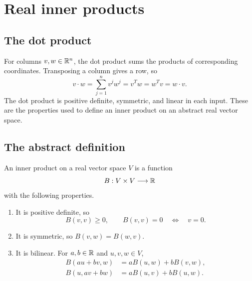 \section{Real inner products}
\label{sec:linear-algebra-i:real-inner-products}

\subsection{The dot product}

For columns \(v,w\in\mathbb{R}^n\), the dot product sums the products of
corresponding coordinates. Transposing a column gives a row, so
\[
  v\cdot w=\sum_{j=1}^n v^jw^j=v^Tw=w^Tv=w\cdot v.
\]
The dot product is positive definite, symmetric, and linear in each
input. These are the properties used to define an inner product on
an abstract real vector space.

\subsection{The abstract definition}


\begin{definition}
  An inner product on a real vector space \(V\) is a function
  \[
    B:V\times V\longrightarrow\mathbb{R}
  \]
  with the following properties.
  \begin{enumerate}
    \item It is positive definite, so
      \[
        B(v,v)\ge0,\qquad B(v,v)=0\quad\Longleftrightarrow\quad v=0.
      \]
    \item It is symmetric, so \(B(v,w)=B(w,v)\).
    \item It is bilinear. For \(a,b\in\mathbb{R}\) and \(u,v,w\in V\),
      \[
        \begin{aligned}
          B(au+bv,w)&=aB(u,w)+bB(v,w),\\
          B(u,av+bw)&=aB(u,v)+bB(u,w).
        \end{aligned}
      \]
  \end{enumerate}
\end{definition}

